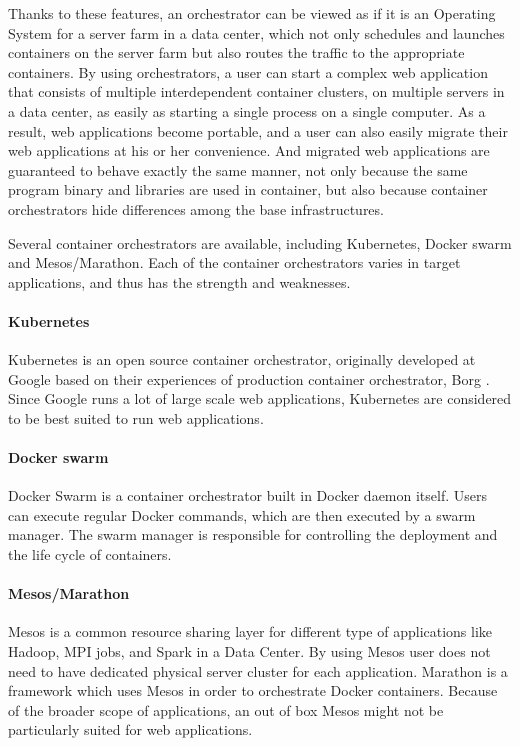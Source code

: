 Thanks to these features, an orchestrator can be viewed as if it is an Operating System for a server farm in a data center, which not only schedules and launches containers on the server farm but also routes the traffic to the appropriate containers.
By using orchestrators, a user can start a complex web application that consists of multiple interdependent container clusters, on multiple servers in a data center, as easily as starting a single process on a single computer.
As a result, web applications become portable, and a user can also easily migrate their web applications at his or her convenience.
And migrated web applications are guaranteed to behave exactly the same manner, not only because the same program binary and libraries are used in container, but also because container orchestrators hide differences among the base infrastructures.

Several container orchestrators are available, including Kubernetes, Docker swarm and Mesos/Marathon.
Each of the container orchestrators varies in target applications, and thus has the strength and weaknesses.

\paragraph{Kubernetes}
Kubernetes \cite{burns2016borg} is an open source container orchestrator, originally developed at Google based on their experiences of production container orchestrator, Borg \cite{Verma2015}. 
Since Google runs a lot of large scale web applications, Kubernetes are considered to be best suited to run web applications.

\paragraph{Docker swarm}
Docker Swarm is a container orchestrator built in Docker daemon itself.
Users can execute regular Docker commands, which are then executed by a swarm manager. 
The swarm manager is responsible for controlling the deployment and the life cycle of containers.

\paragraph{Mesos/Marathon}
Mesos \cite{hindman2011mesos} is a common resource sharing layer for different type of applications like Hadoop, MPI jobs, and Spark in a Data Center. 
By using Mesos user does not need to have  dedicated physical server cluster for each application.
Marathon is a framework which uses Mesos in order to orchestrate Docker containers.
Because of the broader scope of applications, an out of box Mesos might not be particularly suited for web applications.

